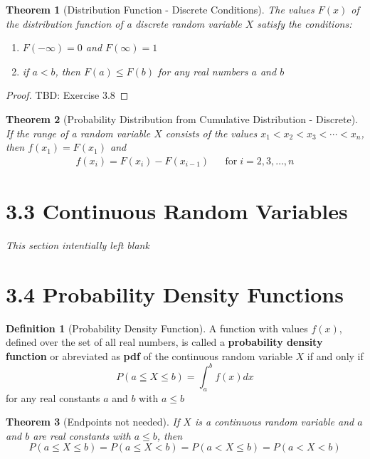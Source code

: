 \documentclass[
10pt,reqno
]{amsart}
\newtheorem{thm}{Theorem}[section]
\theoremstyle{definition}
\newtheorem{definition}{Definition}[section]
\begin{document}
\begin{thm}[Distribution Function - Discrete Conditions]
The values \(F(x)\) of the distribution function of a discrete random variable \(X\) satisfy the conditions:
\begin{enumerate}
	\item \(F(- \infty ) = 0\) and \(F(\infty) = 1\)
	\item if \(a < b\), then \(F(a) \leq F(b)\) for any real numbers \(a\) and \(b\)
\end{enumerate}
\end{thm}

\begin{proof}
TBD: Exercise 3.8
\end{proof}

\begin{thm}[Probability Distribution from Cumulative Distribution - Discrete]
If the range of a random variable \(X\) consists of the values \(x_1 < x_2 < x_3 < \cdots < x_n\), then \(f(x_1)=F(x_1)\) and
\begin{align*}
f(x_i)=F(x_i)-F(x_{i-1}) && \text{for} \; i = 2,3,\ldots,n
\end{align*}
\end{thm}


\section*{3.3 Continuous Random Variables}
\textit{This section intentially left blank}

\section*{3.4 Probability Density Functions}

\begin{definition}[Probability Density Function]
A function with values \(f(x)\), defined over the set of all real numbers, is called a \textbf{probability density function} or abreviated as \textbf{pdf} of the continuous random variable \(X\) if and only if 
\[
P(a \leqq X \leq b) = \int_a^b f(x)dx
\]
for any real constants \(a\) and \(b\) with \(a \leq b\)
\end{definition}

\begin{thm}[Endpoints not needed]
If \(X\) is a continuous random variable and \(a\) and \(b\) are real constants with \(a \leq b\), then
\[
P(a \leq X \leq b) = P(a \leq X < b) = P(a < X \leq b) = P(a < X < b)
\]
\end{thm}
\end{document}

